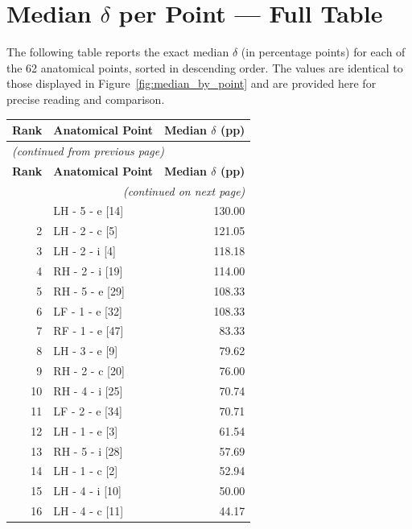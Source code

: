 \documentclass[11pt,a4paper]{article}
\begin{document}
\newpage

\section{Median \texorpdfstring{$\delta$}{delta} per Point --- Full Table}

The following table reports the exact median $\delta$ (in percentage points)
for each of the 62 anatomical points, sorted in descending order.
The values are identical to those displayed in Figure~\ref{fig:median_by_point}
and are provided here for precise reading and comparison.

\bigskip

\begin{longtable}{@{}rlr@{}}
\toprule
\textbf{Rank} & \textbf{Anatomical Point} & \textbf{Median $\delta$ (pp)} \\
\midrule
\endfirsthead
\multicolumn{3}{l}{\small\itshape (continued from previous page)} \\
\toprule
\textbf{Rank} & \textbf{Anatomical Point} & \textbf{Median $\delta$ (pp)} \\
\midrule
\endhead
\midrule
\multicolumn{3}{r}{\small\itshape (continued on next page)} \\
\endfoot
\bottomrule
\endlastfoot
    1 & LH - 5 - e [14] & 130.00 \\
    2 & LH - 2 - c [5] & 121.05 \\
    3 & LH - 2 - i [4] & 118.18 \\
    4 & RH - 2 - i [19] & 114.00 \\
    5 & RH - 5 - e [29] & 108.33 \\
    6 & LF - 1 - e [32] & 108.33 \\
    7 & RF - 1 - e [47] & 83.33 \\
    8 & LH - 3 - e [9] & 79.62 \\
    9 & RH - 2 - c [20] & 76.00 \\
    10 & RH - 4 - i [25] & 70.74 \\
    11 & LF - 2 - e [34] & 70.71 \\
    12 & LH - 1 - e [3] & 61.54 \\
    13 & RH - 5 - i [28] & 57.69 \\
    14 & LH - 1 - c [2] & 52.94 \\
    15 & LH - 4 - i [10] & 50.00 \\
    16 & LH - 4 - c [11] & 44.17 \\

\end{longtable}
\end{document}
